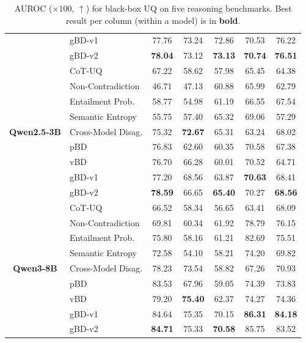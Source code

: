 \documentclass[letterpaper]{article} %
\begin{document}
\begin{table}[t]
\begin{tabular}{c l cc ccc}
      & gBD-v1                  & 77.76 & 73.24 & 72.86 & 70.53 & 76.22 \\
      & gBD-v2                  & \textbf{78.04} & 73.12 & \textbf{73.13} & \textbf{70.74} & \textbf{76.51} \\
    \midrule
    \multirow{9}{*}{\textbf{Qwen2.5-3B}}
      & CoT-UQ                  & 67.22 & 58.62 & 57.98 & 65.45 & 64.38 \\
      & Non-Contradiction       & 46.71 & 47.13 & 60.88 & 65.99 & 62.79 \\
      & Entailment Prob.        & 58.77 & 54.98 & 61.19 & 66.55 & 67.54 \\
      & Semantic Entropy        & 55.75 & 57.40 & 65.32 & 69.06 & 57.29 \\
      & Cross-Model Disag.      & 75.32 & \textbf{72.67} & 65.31 & 63.24 & 68.02 \\
    \cmidrule(lr){2-7}
      & pBD                     & 76.83 & 62.60 & 60.35 & 70.58 & 67.38 \\
      & vBD                     & 76.70 & 66.28 & 60.01 & 70.52 & 64.71 \\
      & gBD-v1                  & 77.20 & 68.56 & 63.87 & \textbf{70.63} & 68.41 \\
      & gBD-v2                  & \textbf{78.59} & 66.65 & \textbf{65.40} & 70.27 & \textbf{68.56} \\
    \midrule
    \multirow{9}{*}{\textbf{Qwen3-8B}}
      & CoT-UQ      & 66.52 & 58.34 & 56.65 & 63.41 & 68.09 \\
      & Non-Contradiction       & 69.81 & 60.34 & 61.92 & 78.79 & 76.15 \\
      & Entailment Prob.        & 75.80 & 58.16 & 61.21 & 82.69 & 75.51 \\
      & Semantic Entropy        & 72.58 & 54.10 & 58.21 & 74.20 & 69.82 \\
      & Cross-Model Disag.      & 78.23 & 73.54 & 58.82 & 67.26 & 70.93 \\
    \cmidrule(lr){2-7}
      & pBD                     & 83.53 & 67.96 & 59.05 & 74.39 & 73.83 \\
      & vBD                     & 79.20 & \textbf{75.40} & 62.37 & 74.27 & 74.36 \\
      & gBD-v1                  & 84.64 & 75.35 & 70.15 & \textbf{86.31} & \textbf{84.18} \\
      & gBD-v2                  & \textbf{84.71} & 75.33 & \textbf{70.58} & 85.75 & 83.52 \\
    \bottomrule
  \end{tabular}
  \caption{AUROC ($\times 100$, $\uparrow$) for black-box UQ on five reasoning
  benchmarks. Best result per column (within a model) is in \textbf{bold}.}
  \label{tab:main-results}
\end{table}
\end{document}
